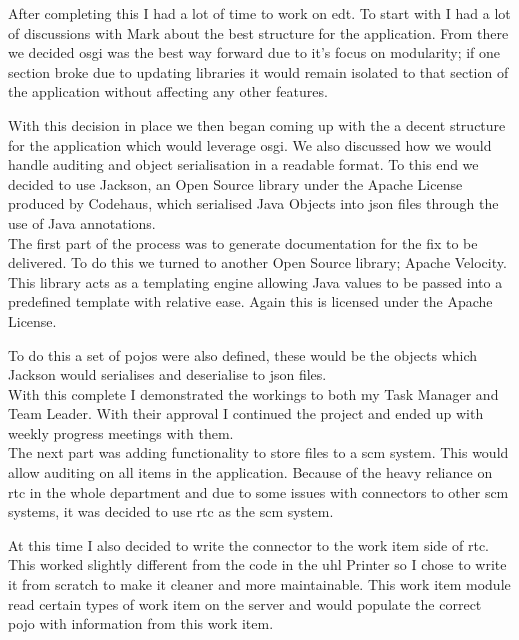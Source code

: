 \documentclass[a4paper,11pt]{report}
\begin{document}
After completing this I had a lot of time to work on \gls{edt}. To start with I had a lot of 
discussions with Mark about the best structure for the application. From there we decided
\gls{osgi} was the best way forward due to it's focus on modularity; if one section broke due to
updating libraries it would remain isolated to that section of the application without affecting
any other features.

With this decision in place we then began coming up with the a decent structure for the application
which would leverage \gls{osgi}. We also discussed how we would handle auditing and object 
serialisation in a readable format. To this end we decided to use Jackson, an Open Source library
under the Apache License produced by Codehaus, which serialised Java Objects into \gls{json} files
through the use of Java annotations. \\



The first part of the process was to generate documentation for the fix to be delivered. To do this
we turned to another Open Source library; Apache Velocity. This library acts as a templating engine
allowing Java values to be passed into a predefined template with relative ease. Again this is
licensed under the Apache License.

To do this a set of \gls{pojo}s were also defined, these would be the objects which Jackson would
serialises and deserialise to \gls{json} files. \\



With this complete I demonstrated the workings to both my Task Manager and Team Leader. With their
approval I continued the project and ended up with weekly progress meetings with them. \\



The next part was adding functionality to store files to a \gls{scm} system. This would allow 
auditing on all items in the application. Because of the heavy reliance on \gls{rtc} in the whole
department and due to some issues with connectors to other \gls{scm} systems, it was decided to use
\gls{rtc} as the \gls{scm} system.

At this time I also decided to write the connector to the work item side of \gls{rtc}. This worked
slightly different from the code in the \gls{uhl} Printer so I chose to write it from scratch to
make it cleaner and more maintainable. This work item module read certain types of work item on the
server and would populate the correct \gls{pojo} with information from this work item. \\
\end{document}
